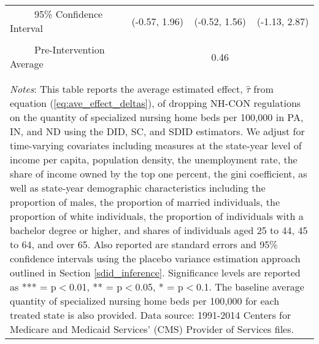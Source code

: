 \documentclass[12pt]{article}
\begin{document}
\begin{table}[htbp]
\begin{tabular}{l*{3}{c}}
\\[-2ex]
\multicolumn{1}{l}{\ \ \ \ \ 95\% Confidence Interval}&   \multicolumn{1}{c}{(-0.57, 1.96)}&   \multicolumn{1}{c}{(-0.52, 1.56)}&   \multicolumn{1}{c}{(-1.13, 2.87)}\\
\\[-2ex]
\multicolumn{1}{l}{\ \ \ \ \ Pre-Intervention Average}&   \multicolumn{3}{c}{0.46}\\
\\[-.1ex]
\hline\hline
\\[-2ex]
\multicolumn{4}{p{.75\linewidth}}{\footnotesize \textit{Notes}: This table reports the average estimated effect, $\hat{\tau}$ from equation (\ref{eq:ave_effect_deltas}), of dropping NH-CON regulations on the quantity of specialized nursing home beds per 100,000 in PA, IN, and ND using the DID, SC, and SDID estimators. We adjust for time-varying covariates including measures at the state-year level of income per capita, population density, the unemployment rate, the share of income owned by the top one percent, the gini coefficient, as well as state-year demographic characteristics including the proportion of males, the proportion of married individuals, the proportion of white individuals, the proportion of individuals with a bachelor degree or higher, and shares of individuals aged 25 to 44, 45 to 64, and over 65. Also reported are standard errors and 95\% confidence intervals using the placebo variance estimation approach outlined in Section \ref{sdid_inference}. Significance levels are reported as *** = p$<$0.01, ** = p$<$0.05, * = p$<$0.1. The baseline average quantity of specialized nursing home beds per 100,000 for each treated state is also provided. Data source: 1991-2014 Centers for Medicare and Medicaid Services’ (CMS) Provider of Services files.}
\end{tabular}
\end{table}
\vfill


\end{document}
